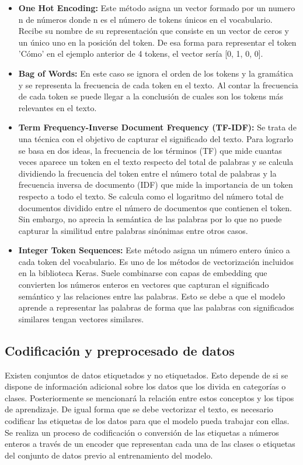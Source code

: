 \begin{itemize}
	\item \textbf{One Hot Encoding:} Este método asigna un vector formado por un numero n de números donde n es el número de tokens únicos en el vocabulario.
	Recibe su nombre de su representación que consiste en un vector de ceros y un único uno en la posición del token. De esa forma para representar el token 'Cómo' en el ejemplo anterior de 4 tokens, el vector sería [0, 1, 0, 0].
	\item \textbf{Bag of Words:} En este caso se ignora el orden de los tokens y la gramática y se representa la frecuencia de cada token en el texto.
	Al contar la frecuencia de cada token se puede llegar a la conclusión de cuales son los tokens más relevantes en el texto.
	\item \textbf{Term Frequency-Inverse Document Frequency (TF-IDF):} Se trata de una técnica con el objetivo de capturar el significado del texto. 
	Para lograrlo se basa en dos ideas, la frecuencia de los términos (TF) que mide cuantas veces aparece un token en el texto respecto del total de palabras y se calcula dividiendo la frecuencia del token entre el número total de palabras y la frecuencia inversa de documento (IDF) que mide la importancia de un token respecto a todo el texto.
	Se calcula como el logaritmo del número total de documentos dividido entre el número de documentos que contienen el token.
	Sin embargo, no aprecia la semántica de las palabras por lo que no puede capturar la similitud entre palabras sinónimas entre otros casos.
	\item \textbf{Integer Token Sequences:} Este método asigna un número entero único a cada token del vocabulario. Es uno de los métodos de vectorización incluidos en la biblioteca Keras.
	Suele combinarse con capas de embedding que convierten los números enteros en vectores que capturan el significado semántico y las relaciones entre las palabras.
	Esto se debe a que el modelo aprende a representar las palabras de forma que las palabras con significados similares tengan vectores similares.
\end{itemize}

\subsection{Codificación y preprocesado de datos}

Existen conjuntos de datos etiquetados y no etiquetados. Esto depende de si se dispone de información adicional sobre los datos que los divida en categorías o clases.
Posteriormente se mencionará la relación entre estos conceptos y los tipos de aprendizaje.
De igual forma que se debe vectorizar el texto, es necesario codificar las etiquetas de los datos para que el modelo pueda trabajar con ellas.
Se realiza un proceso de codificación o conversión de las etiquetas a números enteros a través de un encoder que representan cada una de las clases o etiquetas del conjunto de datos previo al entrenamiento del modelo.

